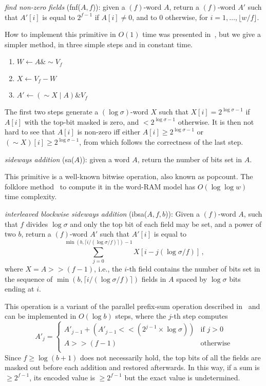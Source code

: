 \documentclass{llncs}
\newcommand{\ceil}[1]{\lceil #1 \rceil}
\newcommand{\floor}[1]{\lfloor #1 \rfloor}
\newcommand{\uand}{\mathrel{\&}}
\newcommand{\uor}{\mathrel{|}}
\newcommand{\unot}{\mathop{\sim}}
\newcommand{\fsize}{f}
\newcommand{\bsize}{b}
\newcommand{\word}[1]{#1}
\newcommand{\fword}[1]{$(#1)$-word}
\begin{document}
\medskip
\noindent\emph{find non-zero fields} (\textsf{fnf}($\word{A},\fsize$)): given a
\fword{\fsize} $\word{A}$, return a \fword{\fsize} $\word{A'}$
such that $\word{A'}[i]$ is equal to $2^{\fsize - 1}$ if
$\word{A}[i]\neq 0$, and to $0$ otherwise, for
$i=1,\ldots,\floor{w/\fsize}$.
\smallskip

\noindent How to implement this primitive in $O(1)$ time was presented
in~\cite[Sect.~4]{BreslauerGG2012}, but we give a simpler method, in
three simple steps and in constant time.
\begin{enumerate}
\item $\word{W}\leftarrow \word{A} \uand \unot\word{V_{\fsize}}$
\item $\word{X}\leftarrow \word{V_{\fsize}} - \word{W}$
\item $\word{A'}\leftarrow (\unot\word{X} \uor \word{A}) \uand \word{V_{\fsize}}$
\end{enumerate}
The first two steps generate a \fword{\log\sigma} $\word{X}$ such
that $\word{X}[i] = 2^{\log\sigma-1}$ if $\word{A}[i]$ with the
top-bit masked is zero, and $ < 2^{\log\sigma-1}$ otherwise. It is
then not hard to see that $\word{A}[i]$ is non-zero iff either
$\word{A}[i]\ge 2^{\log\sigma-1}$ or $(\unot\word{X})[i]\ge
2^{\log\sigma-1}$, from which follows the correctness of the last
step.

\medskip
\noindent\emph{sideways addition} (\textsf{sa}($\word{A}$)): given a word $\word{A}$,
return the number of bits set in $\word{A}$.
\smallskip

\noindent This primitive is a well-known bitwise operation, also known
as popcount. The folklore
method~\cite{DBLP:conf/wea/Vigna08}
to compute it in the word-RAM model has $O(\log \log w)$ time complexity.

\medskip
\noindent\emph{interleaved blockwise sideways addition} (\textsf{ibsa}($A,\fsize,\bsize$)):
Given a \fword{\fsize} $A$, such that $\fsize$ divides $\log\sigma$ and
only the top bit of each field may be set, and a power of two $b$,
return a \fword{\fsize} $A'$ such that $\word{A'}[i]$ is equal to
$$
\sum_{j=0}^{\min(b,\ceil{i/(\log\sigma / f)})-1} X[i-j(\log\sigma / f)]\,,
$$
where $X = A>> (\fsize - 1)$, i.e., the $i$-th field contains the
number of bits set in the sequence of $\min(b,\ceil{i/(\log\sigma / f)})$
fields in $\word{A}$ spaced by $\log\sigma$ bits ending at $i$.
\smallskip

\noindent This operation is a variant of the parallel prefix-sum operation
described in~\cite{HS1986} and can be implemented in $O(\log b)$
steps, where the $j$-th step computes
$$
A'_j = \begin{cases}
  A'_{j-1} + (A'_{j-1} << (2^{j-1}\times \log\sigma)) & \text{if } j > 0 \\
  A >> (\fsize-1) & \text{otherwise} \\
\end{cases}
$$
Since $\fsize \ge \log(\bsize + 1)$ does not necessarily hold, the top
bits of all the fields are masked out before each addition and
restored afterwards. In this way, if a sum is $\ge 2^{\fsize-1}$, its
encoded value is $\ge 2^{\fsize-1}$ but the exact value is
undetermined.
\end{document}
